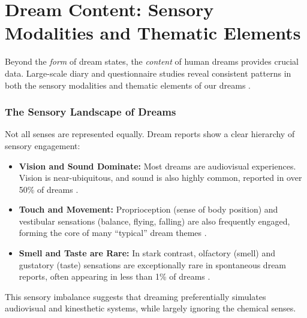 \section{Dream Content: Sensory Modalities and Thematic Elements}\label{sec:content}

Beyond the \textit{form} of dream states, the \textit{content} of human dreams provides crucial data. Large-scale diary and questionnaire studies reveal consistent patterns in both the sensory modalities and thematic elements of our dreams \citep{nielsen2003typical}.

\subsubsection{The Sensory Landscape of Dreams}
Not all senses are represented equally. Dream reports show a clear hierarchy of sensory engagement:
\begin{itemize}
    \item \textbf{Vision and Sound Dominate:} Most dreams are audiovisual experiences. Vision is near-ubiquitous, and sound is also highly common, reported in over 50\% of dreams \citep{zadra2014thematic}.
    \item \textbf{Touch and Movement:} Proprioception (sense of body position) and vestibular sensations (balance, flying, falling) are also frequently engaged, forming the core of many ``typical'' dream themes \citep{nielsen2003typical}.
    \item \textbf{Smell and Taste are Rare:} In stark contrast, olfactory (smell) and gustatory (taste) sensations are exceptionally rare in spontaneous dream reports, often appearing in less than 1\% of dreams \citep{zadra1998prevalence}.
\end{itemize}
This sensory imbalance suggests that dreaming preferentially simulates audiovisual and kinesthetic systems, while largely ignoring the chemical senses.

